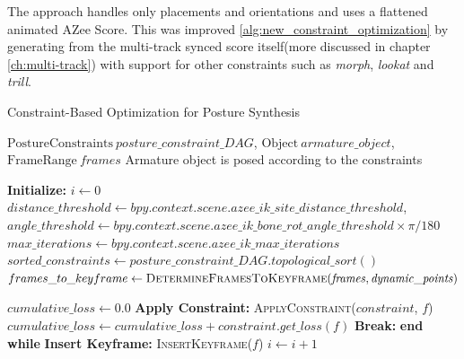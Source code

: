 \documentclass[../../main.tex]{subfiles}
\begin{document}
The approach handles only placements and orientations and uses a flattened animated AZee Score. This was improved \ref{alg:new_constraint_optimization} by generating from the multi-track synced score itself(more discussed in chapter \ref{ch:multi-track}) with support for other constraints such as \emph{morph}, \emph{lookat} and \emph{trill}.

\begin{algorithm}
    \caption{Constraint-Based Optimization for Posture Synthesis}
    \label{alg:trimmed_multi_track_optimization}
    \begin{algorithmic}[1]
        \Require $\text{PostureConstraints} \ \mathit{posture\_constraint\_DAG}$, $\text{Object} \ \mathit{armature\_object}$, $\text{FrameRange} \ \mathit{frames}$
        \Ensure Armature object is posed according to the constraints
        
        \State \textbf{Initialize:} $i \gets 0$
        \State $distance\_threshold \gets \mathit{bpy.context.scene.azee\_ik\_site\_distance\_threshold}$, $angle\_threshold \gets \mathit{bpy.context.scene.azee\_ik\_bone\_rot\_angle\_threshold \times \pi / 180}$
        \State $max\_iterations \gets \mathit{bpy.context.scene.azee\_ik\_max\_iterations}$
        \State $\mathit{sorted\_constraints} \gets \mathit{posture\_constraint\_DAG.topological\_sort()}$
        \State $frames\_to\_keyframe \gets \textsc{DetermineFramesToKeyframe}(\mathit{frames}, \mathit{dynamic\_points})$
        
                \State $\mathit{cumulative\_loss} \gets 0.0$
                    \State \textbf{Apply Constraint:} \textsc{ApplyConstraint}($constraint$, $f$)
                    \State $\mathit{cumulative\_loss} \gets cumulative\_loss + \mathit{constraint.get\_loss(f)}$
                \EndFor
                    \State \textbf{Break:} \textbf{end while}
                \EndIf
                \State \textbf{Insert Keyframe:} \textsc{InsertKeyframe}($f$)
            \EndFor
            \State $i \gets i + 1$
        \EndWhile
        

\end{algorithmic}
\end{algorithm}
\end{document}
